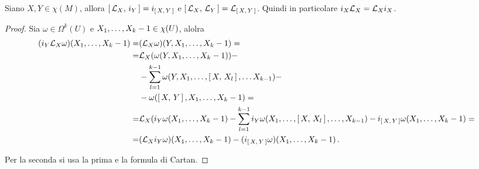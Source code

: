 \begin{corollary}
	Siano $X,Y\in\chi(M)$, allora $\comm{\Lie_X}{i_Y} = i_{\comm XY}$ e $\comm{\Lie_X}{\Lie_Y} = \Lie_{\comm XY}$.
	Quindi in particolare $i_X\Lie_X = \Lie_X i_X$.
\end{corollary}
\begin{proof}
	Sia $\omega \in \Omega^k(U)$ e $\seqb X{k-1}, \in \chi(U)$, alolra
	\begin{align*}
		(i_Y\Lie_X\omega)(\seqb X{k-1},) =& (\Lie_X\omega)(Y,\seqb X{k-1},) =\\
		=&\Lie_X(\omega(Y,\seqb X{k-1},)) -\\
		&-\sum_{l=1}^{k-1}\omega(Y,X_1,\ldots,\comm{X}{X_l},\ldots X_{k-1}) -\\
		&-\omega (\comm XY, \seqb X{k-1},)=\\
		=& \Lie_X(i_Y\omega(\seqb X{k-1},) -\sum_{l=1}^{k-1} i_Y\omega(X_1,\ldots, \comm X{X_l}, \ldots, X_{k-1}) - i_{\comm XY} \omega (\seqb X{k-1},) =\\
		=& (\Lie_X i_Y\omega)(\seqb X{k-1},) - (i_{\comm XY}\omega)(\seqb X{k-1},) \punto
	\end{align*}

	Per la seconda si usa la prima e la formula di Cartan.
\end{proof}




































